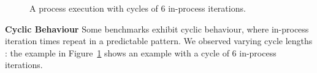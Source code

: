 \documentclass[a4paper,UKenglish]{lipics}
\begin{document}
\begin{figure}[tbp]
\caption{A process execution with cycles of 6 in-process iterations.}
\label{fig:examples:cycles}
\end{figure}

\textbf{Cyclic Behaviour} \label{sub:cyclic}
Some benchmarks exhibit cyclic behaviour, where in-process iteration times
repeat in a predictable pattern. We observed varying cycle lengths : the example in
Figure~\ref{fig:examples:cycles} shows an example with a cycle of 6 in-process
iterations.
\end{document}
